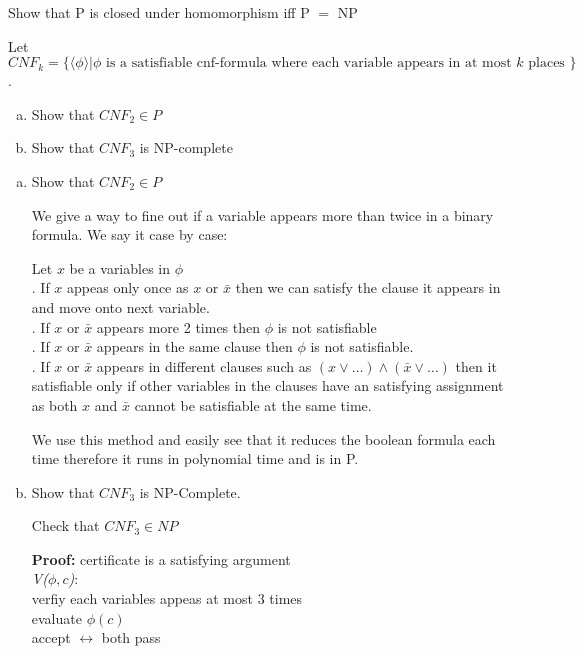 \documentclass[12pt]{exam}
\begin{document}
\begin{questions}
\begin{solution}
  \end{solution}

  \question{} %

  Show that P is closed under homomorphism iff P $=$ NP

  \question{} %

  Let $CNF_{k} = \{\langle \phi \rangle | \phi \text{ is a satisfiable cnf-formula where each variable appears in at most } k \text{ places }\}$.

  \begin{enumerate}[a.]
    \item Show that $CNF_{2} \in P$
    \item Show that $CNF_{3}$ is NP-complete
  \end{enumerate}



  \begin{solution}
    \begin{enumerate}[a.]

      \item Show that $CNF_{2}\in P$

            We give a way to fine out if a variable appears more than twice in a binary formula. We say it case by case:

            Let $x$ be a variables in $\phi$\\
            \null {}. If $x$ appeas only once as $x$ or $\bar x$ then we can satisfy the clause it appears in and move onto next variable.\\
            \null {}. If $x$ or $\bar x$ appears more 2 times then $\phi$ is not satisfiable\\
            \null {}. If $x$ or $\bar x$ appears in the same clause then $\phi$ is not satisfiable.\\
            \null {}. If $x$ or $\bar x$ appears in different clauses such as $(x\lor \dots) \land (\bar x \lor \dots)$ then it satisfiable only if other variables in the clauses have an satisfying assignment as both $x$ and $\bar x$ cannot be satisfiable at the same time.

            We use this method and easily see that it reduces the boolean formula each time therefore it runs in polynomial time and is in P.


      \item Show that $CNF_{3}$ is NP-Complete.

            Check that $CNF_{3}\in NP$

            \textbf{Proof:} certificate is a satisfying argument\\
            \emph{V($\phi, c$)}:\\
            \null \quad verfiy each variables appeas at most 3 times\\
            \null \quad evaluate $\phi(c)$\\
            \null \quad accept $\leftrightarrow$ both pass


\end{enumerate}
\end{solution}
\end{questions}
\end{document}
